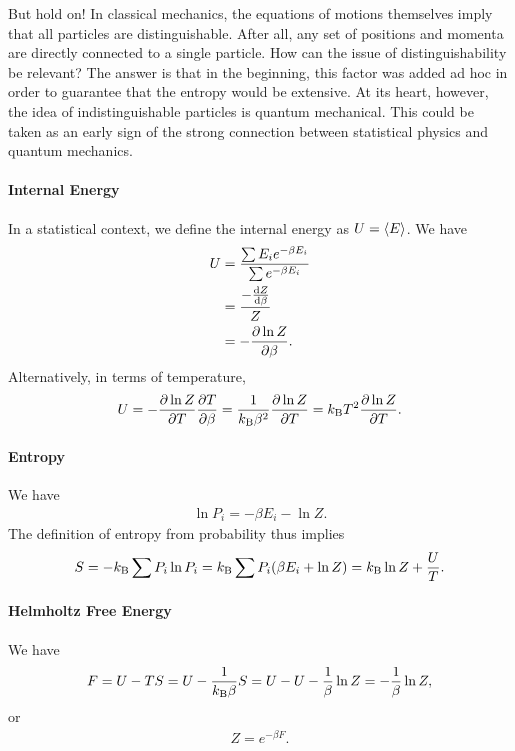 But hold on! In classical mechanics, the equations of motions themselves imply that all particles are distinguishable. After all, any set of positions and momenta are directly connected to a single particle. How can the issue of distinguishability be relevant? The answer is that in the beginning, this factor was added ad hoc in order to guarantee that the entropy would be extensive. At its heart, however, the idea of indistinguishable particles is quantum mechanical. This could be taken as an early sign of the strong connection between statistical physics and quantum mechanics.

\paragraph{Internal Energy}
In a statistical context, we define the internal energy as $U = \expval{E}$. We have
\begin{align*}
	U &= \frac{\sum E_{i}e^{-\beta E_{i}}}{\sum e^{-\beta E_{i}}} \\
	  &= \frac{-\dv{Z}{\beta}}{Z} \\
	  &= -\pdv{\ln{Z}}{\beta}.
\end{align*}
Alternatively, in terms of temperature,
\begin{align*}
	U = -\pdv{\ln{Z}}{T}\pdv{T}{\beta} = \frac{1}{k_{\text{B}}\beta^{2}}\pdv{\ln{Z}}{T} = k_{\text{B}} T^{2}\pdv{\ln{Z}}{T}.
\end{align*}

\paragraph{Entropy}
We have
\begin{align*}
	\ln{P_{i}} = -\beta E_{i} - \ln{Z}.
\end{align*}
The definition of entropy from probability thus implies
\begin{align*}
	S = -k_{\text{B}}\sum P_{i}\ln{P_{i}} = k_{\text{B}}\sum P_{i}(\beta E_{i} + \ln{Z}) = k_{\text{B}}\ln{Z} + \frac{U}{T}.
\end{align*}

\paragraph{Helmholtz Free Energy}
We have
\begin{align*}
	F = U - TS = U - \frac{1}{k_{\text{B}}\beta}S = U - U - \frac{1}{\beta}\ln{Z} = -\frac{1}{\beta}\ln{Z},
\end{align*}
or
\begin{align*}
	Z = e^{-\beta F}.
\end{align*}

